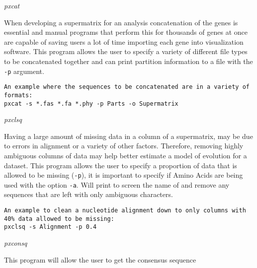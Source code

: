 \documentclass[12pt,letterpaper]{article}
\renewcommand{\subsection}[1]{%
\bigskip
\begin{center}
\begin{large}
\normalfont\itshape #1
\end{large}
\end{center}}
\begin{document}
\subsection{pxcat}

When developing a supermatrix for an analysis concatenation of the genes is essential and manual programs that perform this for thousands of genes at once are capable of saving users a lot of time importing each gene into visualization software. This program allows the user to specify a variety of different file types to be concatenated together and can print partition information to a file with the \texttt{-p} argument.

\begin{flushleft}
\begin{verbatim}
An example where the sequences to be concatenated are in a variety of formats:
pxcat -s *.fas *.fa *.phy -p Parts -o Supermatrix
\end{verbatim}
\end{flushleft}

\subsection{pxclsq}

Having a large amount of missing data in a column of a supermatrix, may be due to errors in alignment or a variety of other factors. Therefore, removing highly ambiguous columns of data may help better estimate a model of evolution for a dataset. This program allows the user to specify a proportion of data that is allowed to be missing (\texttt{-p}), it is important to specify if Amino Acids are being used with the option \texttt{-a}. Will print to screen the name of and remove any sequences that are left with only ambiguous characters.

\begin{flushleft}
\begin{verbatim}
An example to clean a nucleotide alignment down to only columns with 40% data allowed to be missing:
pxclsq -s Alignment -p 0.4
\end{verbatim}
\end{flushleft}

\subsection{pxconsq}

This program will allow the user to get the consensus sequence 
\end{document}
